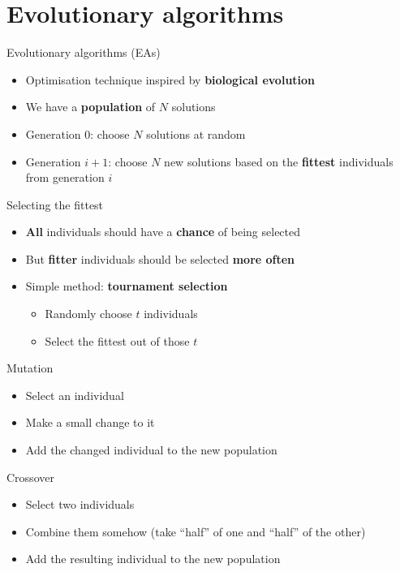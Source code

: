 \part{Evolutionary algorithms}
\frame{\partpage}

\begin{frame}{Evolutionary algorithms (EAs)}
	\begin{itemize}
		\pause\item Optimisation technique inspired by \textbf{biological evolution}
		\pause\item We have a \textbf{population} of $N$ solutions
		\pause\item Generation $0$: choose $N$ solutions at random
		\pause\item Generation $i+1$: choose $N$ new solutions based on the \textbf{fittest} individuals from generation $i$
	\end{itemize}
\end{frame}

\begin{frame}{Selecting the fittest}
	\begin{itemize}
		\pause\item \textbf{All} individuals should have a \textbf{chance} of being selected
		\pause\item But \textbf{fitter} individuals should be selected \textbf{more often}
		\pause\item Simple method: \textbf{tournament selection}
			\begin{itemize}
				\pause\item Randomly choose $t$ individuals
				\pause\item Select the fittest out of those $t$
			\end{itemize}
	\end{itemize}
\end{frame}

\begin{frame}{Mutation}
	\begin{itemize}
		\pause\item Select an individual
		\pause\item Make a small change to it
		\pause\item Add the changed individual to the new population
	\end{itemize}
\end{frame}

\begin{frame}{Crossover}
	\begin{itemize}
		\pause\item Select two individuals
		\pause\item Combine them somehow (take ``half'' of one and ``half'' of the other)
		\pause\item Add the resulting individual to the new population
	\end{itemize}
\end{frame}

